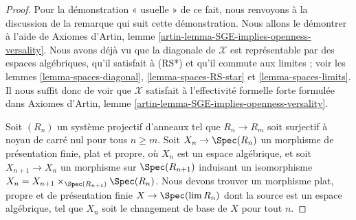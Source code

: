 \begin{proof}
Pour la démonstration « usuelle » de ce fait, nous renvoyons à la discussion de
la remarque qui suit cette démonstration. Nous allons le démontrer à l'aide de
Axiomes d'Artin, lemme \ref{artin-lemma-SGE-implies-openness-versality}.
Nous avons déjà vu que la diagonale de $\mathcal{X}$ est représentable par des
espaces algébriques, qu'il satisfait à (RS*) et qu'il commute aux
limites ; voir les lemmes \ref{lemma-spaces-diagonal},
\ref{lemma-spaces-RS-star} et
\ref{lemma-spaces-limits}.
Il nous suffit donc de voir que $\mathcal{X}$ satisfait à l'effectivité
formelle forte formulée dans
Axiomes d'Artin, lemme \ref{artin-lemma-SGE-implies-openness-versality}.

\medskip\noindent
Soit $(R_n)$ un système projectif d'anneaux tel que $R_n \to R_m$ soit
surjectif à noyau de carré nul pour tous $n \geq m$. Soit
$X_n \to \Spec(R_n)$ un morphisme de présentation finie, plat et propre, où
$X_n$ est un espace algébrique, et soit $X_{n + 1} \to X_n$ un morphisme
sur $\Spec(R_{n + 1})$ induisant un isomorphisme
$X_n = X_{n + 1} \times_{\Spec(R_{n + 1})} \Spec(R_n)$.
Nous devons trouver un morphisme plat, propre et de présentation finie
$X \to \Spec(\lim R_n)$ dont la source est un espace algébrique, tel que
$X_n$ soit le changement de base de $X$ pour tout $n$.


\end{proof}
